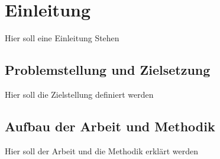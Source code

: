 

\lstset{language=C}

\chapter{Einleitung}

Hier soll eine Einleitung Stehen 





\section{Problemstellung und Zielsetzung}
\label{sec:semant-textauszeichnung}

Hier soll die Zielstellung definiert werden

\section{Aufbau der Arbeit und Methodik}

Hier soll der Arbeit und die Methodik erklärt werden









